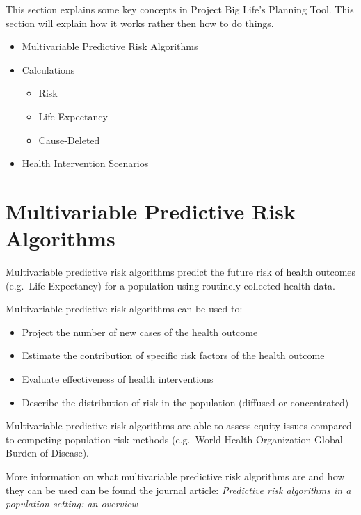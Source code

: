 \documentclass[]{book}
\providecommand{\tightlist}{%
  \setlength{\itemsep}{0pt}\setlength{\parskip}{0pt}}
\begin{document}
This section explains some key concepts in Project Big Life's Planning
Tool. This section will explain how it works rather then how to do
things.

\begin{itemize}
\item
  Multivariable Predictive Risk Algorithms
\item
  Calculations

  \begin{itemize}
  \tightlist
  \item
    Risk
  \item
    Life Expectancy
  \item
    Cause-Deleted
  \end{itemize}
\item
  Health Intervention Scenarios
\end{itemize}

\section{Multivariable Predictive Risk
Algorithms}\label{multivariable-predictive-risk-algorithms}

Multivariable predictive risk algorithms predict the future risk of
health outcomes (e.g.~Life Expectancy) for a population using routinely
collected health data.

Multivariable predictive risk algorithms can be used to:

\begin{itemize}
\tightlist
\item
  Project the number of new cases of the health outcome
\item
  Estimate the contribution of specific risk factors of the health
  outcome
\item
  Evaluate effectiveness of health interventions
\item
  Describe the distribution of risk in the population (diffused or
  concentrated)
\end{itemize}

Multivariable predictive risk algorithms are able to assess equity
issues compared to competing population risk methods (e.g.~World Health
Organization Global Burden of Disease).

More information on what multivariable predictive risk algorithms are
and how they can be used can be found the journal article:
\emph{Predictive risk algorithms in a population setting: an overview}
\citep{PoRTover}
\end{document}
